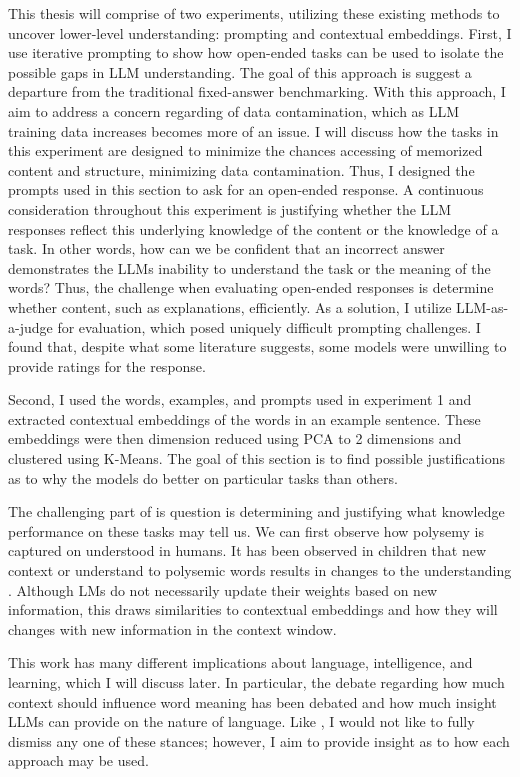\documentclass{brandeis-thesis3.2}
\theoremstyle{plain}
\theoremstyle{definition}
\theoremstyle{remark}
\numberwithin{equation}{section}
\renewcommand\cite{\citep}
\begin{document}
This thesis will comprise of two experiments, utilizing these existing methods to uncover lower-level understanding: prompting and contextual embeddings. First, I use iterative prompting to show how open-ended tasks can be used to isolate the possible gaps in LLM understanding. The goal of this approach is suggest a departure from the traditional fixed-answer benchmarking. With this approach, I aim to address a concern regarding of data contamination, which as LLM training data increases becomes more of an issue. I will discuss how the tasks in this experiment are designed to minimize the chances accessing of memorized content and structure, minimizing data contamination. Thus, I designed the prompts used in this section to ask for an open-ended response. A continuous consideration throughout this experiment is justifying whether the LLM responses reflect this underlying knowledge of the content or the knowledge of a task. In other words, how can we be confident that an incorrect answer demonstrates the LLMs inability to understand the task or the meaning of the words? Thus, the challenge when evaluating open-ended responses is determine whether content, such as explanations, efficiently. As a solution, I utilize LLM-as-a-judge for evaluation, which posed uniquely difficult prompting challenges. I found that, despite what some literature suggests, some models were unwilling to provide ratings for the response.

Second, I used the words, examples, and prompts used in experiment 1 and extracted contextual embeddings of the words in an example sentence. These embeddings were then dimension reduced using PCA to 2 dimensions and clustered using K-Means. The goal of this section is to find possible justifications as to why the models do better on particular tasks than others. 

The challenging part of is question is determining and justifying what knowledge performance on these tasks may tell us. We can first observe how polysemy is captured on understood in humans. It has been observed in children that new context or understand to polysemic words results in changes to the understanding \cite{srinivasan_children_2019}.  Although LMs do not necessarily update their weights based on new information, this draws similarities to contextual embeddings and how they will changes with new information in the context window.

This work has many different implications about language, intelligence, and learning, which I will discuss later. In particular, the debate regarding how much context should influence word meaning has been debated \cite{grindrod_transformers_2024} and how much insight LLMs can provide on the nature of language. Like \citet{grindrod_transformers_2024}, I would not like to fully dismiss any one of these stances; however, I aim to provide insight as to how each approach may be used.
\end{document}
